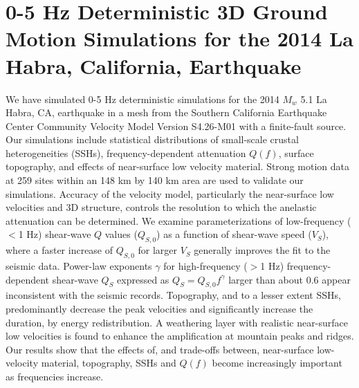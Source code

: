 \newcommand{\red}[1]{\textcolor{red}{#1}}
\newcommand{\blue}[1]{\textcolor{blue}{#1}}
\newcommand{\green}[1]{\textcolor{green}{#1}}
\newcommand{\purple}[1]{\textcolor{purple}{#1}}

\linespread{1.7}
\chapter{0-5 Hz Deterministic 3D Ground Motion Simulations for the 2014 La Habra, California, Earthquake}
\linespread{2.0}
\label{chap:highf}

\graphicspath{{/Users/zhh076/work/PhD_way/high_f/}}

We have simulated 0-5 Hz deterministic simulations for the 2014 $M_w$ 5.1 La Habra, CA, earthquake in a mesh from the Southern California Earthquake Center Community Velocity Model Version S4.26-M01 with a finite-fault source. Our simulations include statistical distributions of small-scale crustal heterogeneities (SSHs), frequency-dependent attenuation $Q(f)$, surface topography, and effects of near-surface low velocity material. Strong motion data at 259 sites within an 148 km by 140 km area are used to validate our simulations. %
Accuracy of the velocity model, particularly the  near-surface low velocities and 3D structure, controls the resolution to which the anelastic attenuation can be determined. We examine parameterizations of low-frequency ($<$1 Hz) shear-wave $Q$ values ($Q_{S,0}$) as a function of shear-wave speed ($V_S$), where a faster increase of $Q_{S,0}$ for larger $V_S$  generally improves the fit to the seismic data. Power-law exponents {$\gamma$} for high-frequency ($>$1 Hz) frequency-dependent shear-wave $Q_S$ expressed as $Q_S=Q_{S,0} f^{\gamma}$ larger than about 0.6 appear inconsistent with the seismic records. 
Topography, and to a lesser extent SSHs, predominantly decrease the peak velocities and significantly increase the duration, by energy redistribution. A weathering layer with realistic near-surface low velocities is found to enhance the amplification at mountain peaks and ridges. Our results show that the effects of, and trade-offs between, near-surface low-velocity material, topography, SSHs and $Q(f)$ become increasingly important as frequencies increase.


